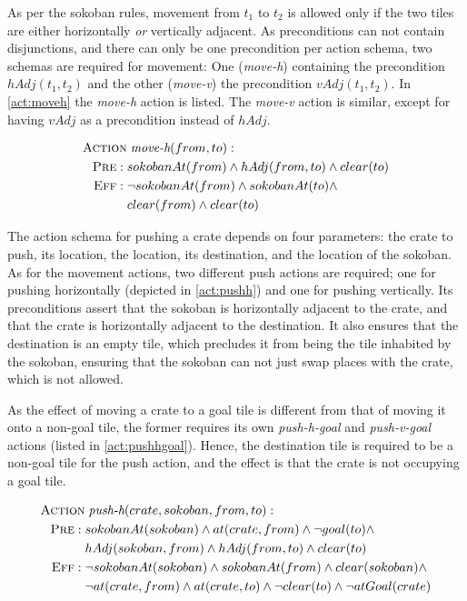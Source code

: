 \documentclass[../Master.tex]{subfiles}
\begin{document}
As per the sokoban rules, movement from $t_1$ to $t_2$ is allowed only if the two tiles are either horizontally \textit{or} vertically adjacent. As preconditions can not contain disjunctions, and there can only be one precondition per action schema, two schemas are required for movement: One (\textit{move-h}) containing the precondition $hAdj(t_1,t_2)$ and the other (\textit{move-v}) the precondition $vAdj(t_1, t_2)$.
In \eqref{act:moveh} the \textit{move-h} action is listed. The \textit{move-v} action is similar, except for having $vAdj$ as a precondition instead of $hAdj$.

\begin{align}
\begin{split} \label{act:moveh}
\textsc{Action} &\; \textit{move-h}(from, to): \\
\textsc{Pre}: \; & sokobanAt(from) \land hAdj(from, to) \land clear(to) \\
\textsc{Eff}: \; & \neg sokobanAt(from) \land sokobanAt(to) \land \\
& clear(from) \land clear(to)
\end{split}
\end{align}

The action schema for pushing a crate depends on four parameters: the crate to push, its location, the location, its destination, and the location of the sokoban. As for the movement actions, two different push actions are required; one for pushing horizontally (depicted in \eqref{act:pushh}) and one for pushing vertically. Its preconditions assert that the sokoban is horizontally adjacent to the crate, and that the crate is horizontally adjacent to the destination. It also ensures that the destination is an empty tile, which precludes it from being the tile inhabited by the sokoban, ensuring that the sokoban can not just swap places with the crate, which is not allowed.

As the effect of moving a crate to a goal tile is different from that of moving it onto a non-goal tile, the former requires its own \textit{push-h-goal}  and \textit{push-v-goal} actions (listed in \eqref{act:pushhgoal}). Hence, the destination tile is required to be a non-goal tile for the push action, and the effect is that the crate is not occupying a goal tile.

\begin{align}
\begin{split} \label{act:pushh}
\textsc{Action} &\; \textit{push-h}(crate, sokoban, from, to): \\
\textsc{Pre}: \; & sokobanAt(sokoban) \land
at(crate, from) \land
\neg goal(to) \land \\
& hAdj(sokoban, from) \land
hAdj(from, to) \land
clear(to)
\\
\textsc{Eff}: \; & \neg sokobanAt(sokoban) \land
sokobanAt(from) \land
clear(sokoban) \land \\
& \neg at(crate, from) \land
at(crate, to) \land
\neg clear(to) \land
\neg atGoal(crate)
\end{split}
\end{align}
\end{document}
